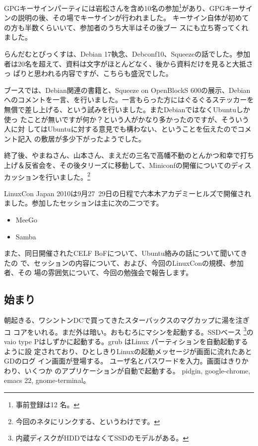 \documentclass[mingoth,a4paper]{jsarticle}
\begin{document}
GPGキーサインパーティには岩松さんを含め10名の参加\footnote{事前登録は12
名。}があり、GPGキーサインの説明の後、その場でキーサインが行われました。
キーサイン自体が初めての方も半数くらいいて、参加者のうち大半はその後ブー
スにも立ち寄ってくれました。

らんだむとぴっくすは、Debian 17執念、Debconf10、Squeezeの話でした。参加
者は20名を超えて、資料は文字がほとんどなく、後から資料だけを見ると大抵さっ
ぱりと思われる内容ですが、こちらも盛況でした。

ブースでは、Debian関連の書籍と、Squeeze on OpenBlockS 600の展示、Debian
へのコメントを一言、を行いました。一言もらった方にはぐるぐるステッカーを
無償で差し上げる、という試みを行いました。またDebianではなくUbuntuしか使っ
たことが無いですが何か？という人がかなり多かったのですが、そういう人に対
してはUbuntuに対する意見でも構わない、ということを伝えたのでコメント記入
の敷居が多少下がったようでした。

終了後、やまねさん、山本さん、まえだの三名で高幡不動のとんかつ和幸で打ち
上げ＆反省会を、その後タリーズに移動して、Miniconfの開催についてのディス
カッションを行いました。\footnote{今回のネタにリンクする、というわけです。}


LinuxCon Japan 2010は9月27~29日の日程で六本木アカデミーヒルズで開催され
ました。参加したセッションは主に次の二つです。
\begin{itemize}
 \item MeeGo
 \item Samba
\end{itemize}
また、同日開催されたCELF BoFについて、Ubuntu絡みの話について聞いてきたの
で、セッションの内容について、および、今回のLinuxConの規模、参加者、その
場の雰囲気について、今回の勉強会で報告します。


\subsection{始まり}

朝起きる、ワシントンDCで買ってきたスターバックスのマグカップに湯を注ぎコ
コアをいれる。まだ外は暗い。おもむろにマシンを起動する。SSDベース
\footnote{内蔵ディスクがHDDではなくてSSDのモデルがある。}のvaio
type Pはしずかに起動する。grub はLinux パーティションを自動起動するように設
定されており、ひとしきりLinuxの起動メッセージが画面に流れたあとGDのログ
イン画面が登場する。
ユーザ名とパスワードを入力。画面はきりかわり、いくつか
のアプリケーションが自動で起動する。
pidgin, google-chrome, emacs 22, gnome-terminal。
\end{document}
